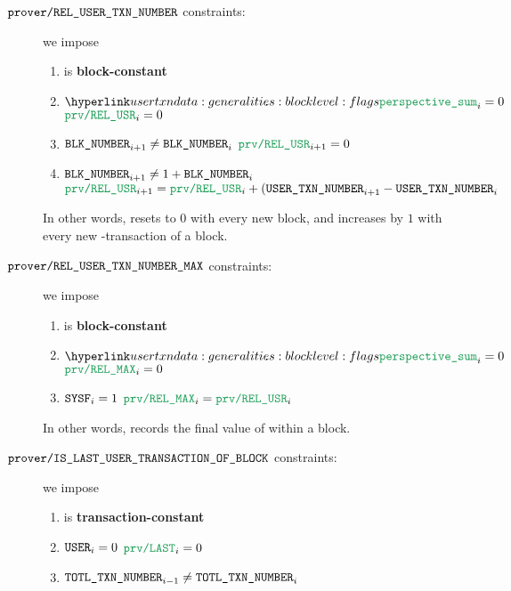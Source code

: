 \begin{description}
        \item[$\texttt{prover\texttt{/}REL\_\texttt{USER}\texttt{\_}\texttt{TXN\_NUMBER}} {}$ constraints:]
                we impose
                \begin{enumerate}
                        \item \proverColB{} is \textbf{block-constant}
                        \item \If $\perspectiveSum _{i} = 0$ \Then $\proverColB _{i} = 0$
                        \item \If $\texttt{BLK\_NUMBER} _{i + 1} \neq     \texttt{BLK\_NUMBER} _{i}$ \Then $\proverColB _{i + 1} = 0$
                        \item \If $\texttt{BLK\_NUMBER} _{i + 1} \neq 1 + \texttt{BLK\_NUMBER} _{i}$ \Then $\proverColB _{i + 1} = \proverColB _{i} + (\userTransactionNumber _{i + 1} - \userTransactionNumber _{i}$
                \end{enumerate}
                \saNote{}
                In other words,
                \proverColB{} resets to $0$ with every new block,
                and increases by $1$ with every new \user{}-transaction
                of a block.
        \item[$\texttt{prover\texttt{/}REL\_\texttt{USER}\texttt{\_}\texttt{TXN\_NUMBER}\_MAX} {}$ constraints:]
                we impose
                \begin{enumerate}
                        \item \proverColC{} is \textbf{block-constant}
                        \item \If $\perspectiveSum _{i} = 0$ \Then $\proverColC _{i} = 0$
                        \item \If $\texttt{SYSF} _{i} = 1$ \Then $\proverColC _{i} = \proverColB _{i}$
                \end{enumerate}
                \saNote{}
                In other words,
                \proverColC{} records the final value of \proverColB{} within a block.
        \item[$\texttt{prover\texttt{/}IS\_LAST\_USER\_TRANSACTION\_OF\_BLOCK} {}$ constraints:]
                we impose
                \begin{enumerate}
                        \item \proverColD{} is \textbf{transaction-constant}
                        \item \If $\texttt{USER} _{i} = 0$ \Then $\proverColD _{i} = 0$
                        \item
                                \If   $\texttt{TOTL}\texttt{\_}\texttt{TXN\_NUMBER} _{i - 1} \neq \texttt{TOTL}\texttt{\_}\texttt{TXN\_NUMBER} _{i}$

\end{enumerate}
\end{description}
